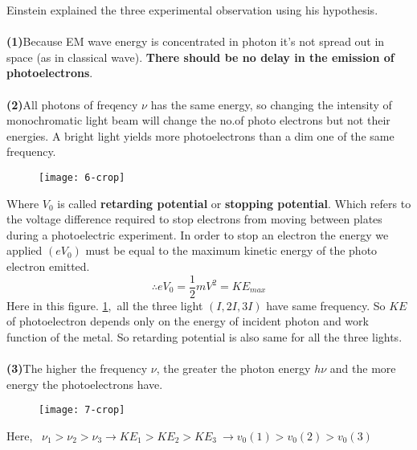 Einstein explained the three experimental observation using his hypothesis.\\\\
\textbf{(1)}\quad Because EM wave energy is concentrated in photon it's not spread out in space (as in classical wave). \textbf{There should be no delay in the emission of photoelectrons}.\\\\
\textbf{(2)}\quad All photons of freqency $\nu$ has the same energy, so changing the intensity of monochromatic light beam will change the no.of photo electrons but not their energies. A bright light yields more photoelectrons than a dim one of the same frequency.
\begin{figure}[H]
	\centering
	\texttt{[image: 6-crop]}
	\caption{}
	\label{photo2}
\end{figure}
Where $V_0$ is called \textbf{retarding potential} or \textbf{stopping potential}. Which refers to the voltage difference required to stop electrons from moving between plates during a photoelectric experiment. In order to stop an electron the energy we applied $(eV_0)$ must be equal to the maximum kinetic energy of the photo electron emitted.
$$\therefore eV_0=\frac{1}{2}mV^2=KE_{max}$$
Here in this figure. \ref{photo2},\  all the three light $(I,2I,3I)$ have same frequency. So $KE$ of photoelectron depends only on the energy of incident photon and work function of the metal. So retarding potential is also same for all the three lights.\\\\
\textbf{(3)}\quad The higher the frequency $\nu$, the greater the photon energy $h\nu$ and the more energy the photoelectrons have.
\begin{figure}[H]
	\centering
	\texttt{[image: 7-crop]}
	\caption{}
	\label{photo3}
\end{figure} 
Here, \   $\nu_1>\nu_2>\nu_3 \rightarrow KE_1>KE_2>KE_3 \ \rightarrow v_0(1)>v_0(2)>v_0(3)$

